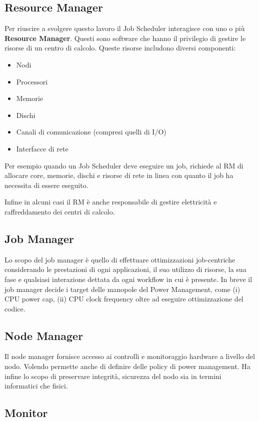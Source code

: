 \subsection{Resource Manager}
Per riuscire a svolgere questo lavoro il Job Scheduler interagisce con uno o più \textbf{Resource Manager}. Questi sono software che hanno il privilegio di gestire le risorse di un centro di calcolo. Queste risorse includono diversi componenti:
\begin{itemize}
    \item Nodi
    \item Processori
    \item Memorie
    \item Dischi
    \item Canali di comunicazione (compresi quelli di I/O)
    \item Interfacce di rete 
\end{itemize}
Per esempio quando un Job Scheduler deve eseguire un job, richiede al RM di allocare core, memorie, dischi e risorse di rete in linea con quanto il job ha necessita di essere eseguito.

Infine in alcuni casi il RM è anche responsabile di gestire elettricità e raffreddamento dei centri di calcolo.


\subsection{Job Manager}
Lo scopo del job manager è quello di effettuare ottimizzazioni job-centriche considerando le prestazioni di ogni applicazioni, il suo utilizzo di risorse, la sua fase e qualsiasi interazione dettata da ogni workflow in cui è presente. In breve il job manager decide i target delle manopole del Power Management, come (i) CPU power cap, (ii) CPU clock frequency oltre ad eseguire ottimizzazione del codice.

\subsection{Node Manager}
Il node manager fornisce accesso ai controlli e monitoraggio hardware a livello del nodo. Volendo permette anche di definire delle policy di power management. Ha infine lo scopo di preservare integrità, sicurezza del nodo sia in termini informatici che fisici.

\subsection{Monitor}

